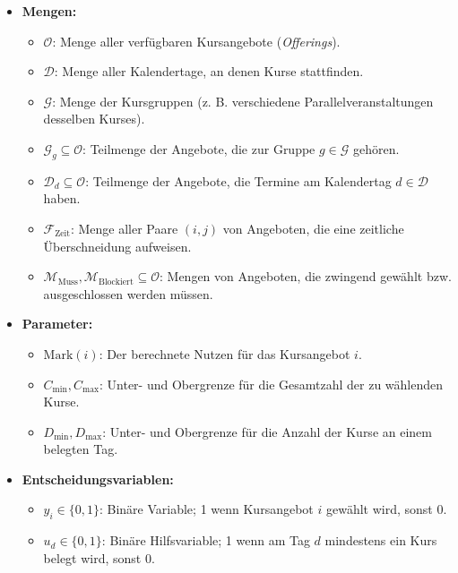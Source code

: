 \begin{itemize}
    \item \textbf{Mengen:}
          \begin{itemize}
              \item $\mathcal{O}$: Menge aller verfügbaren Kursangebote (\textit{Offerings}).
              \item $\mathcal{D}$: Menge aller Kalendertage, an denen Kurse stattfinden.
              \item $\mathcal{G}$: Menge der Kursgruppen (z. B. verschiedene Parallelveranstaltungen desselben Kurses).
              \item $\mathcal{G}_g \subseteq \mathcal{O}$: Teilmenge der Angebote, die zur Gruppe $g \in \mathcal{G}$ gehören.
              \item $\mathcal{D}_d \subseteq \mathcal{O}$: Teilmenge der Angebote, die Termine am Kalendertag $d \in \mathcal{D}$ haben.
              \item $\mathcal{F}_{\text{Zeit}}$: Menge aller Paare $(i, j)$ von Angeboten, die eine zeitliche Überschneidung aufweisen.
              \item $\mathcal{M}_{\text{Muss}}, \mathcal{M}_{\text{Blockiert}} \subseteq \mathcal{O}$: Mengen von Angeboten, die zwingend gewählt bzw. ausgeschlossen werden müssen.
          \end{itemize}
    \item \textbf{Parameter:}
          \begin{itemize}
              \item $\text{Mark}(i)$: Der berechnete Nutzen für das Kursangebot $i$.
              \item $C_{\min}, C_{\max}$: Unter- und Obergrenze für die Gesamtzahl der zu wählenden Kurse.
              \item $D_{\min}, D_{\max}$: Unter- und Obergrenze für die Anzahl der Kurse an einem belegten Tag.
          \end{itemize}
    \item \textbf{Entscheidungsvariablen:}
          \begin{itemize}
              \item $y_i \in \{0, 1\}$: Binäre Variable; 1 wenn Kursangebot $i$ gewählt wird, sonst 0.
              \item $u_d \in \{0, 1\}$: Binäre Hilfsvariable; 1 wenn am Tag $d$ mindestens ein Kurs belegt wird, sonst 0.
          \end{itemize}
\end{itemize}



